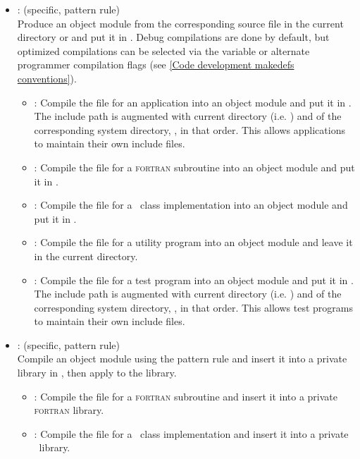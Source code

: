 \begin{itemize}
\item
    : (specific, pattern rule)
   \\ Produce an object module from the corresponding source file in the
   current directory or  and put it in .
   Debug compilations are done by default, but optimized compilations can be
   selected via the  variable or alternate programmer compilation
   flags (see \ref{Code development makedefs conventions}).
   \begin{itemize}
   \item
      : Compile the  file for an application into an
      object module and put it in .  The include path is
      augmented with current directory (i.e. ) and of the
      corresponding system directory, , in that order.  This
      allows applications to maintain their own include files.
   \item
      : Compile the  file for a \textsc{fortran} subroutine
      into an object module and put it in .
   \item
      : Compile the  file for a \cplusplus\ class
      implementation into an object module and put it in .
   \item
      : Compile the  file for a utility program into an
      object module and leave it in the current directory.
   \item
      : Compile the  file for a test program into an
      object module and put it in .  The include path is
      augmented with current directory (i.e. ) and of the
      corresponding system directory, , in that order.  This
      allows test programs to maintain their own include files.
   \end{itemize}

\item
    : (specific, pattern rule)
   \\ Compile an object module using the  pattern rule and insert it
   into a private library in , then apply 
   to the library.
   \begin{itemize}
   \item
      : Compile the  file for a \textsc{fortran} subroutine
      and insert it into a private \textsc{fortran} library.
   \item
      : Compile the  file for a \cplusplus\ class
      implementation and insert it into a private \cplusplus\ library.
   \end{itemize}


\end{itemize}
